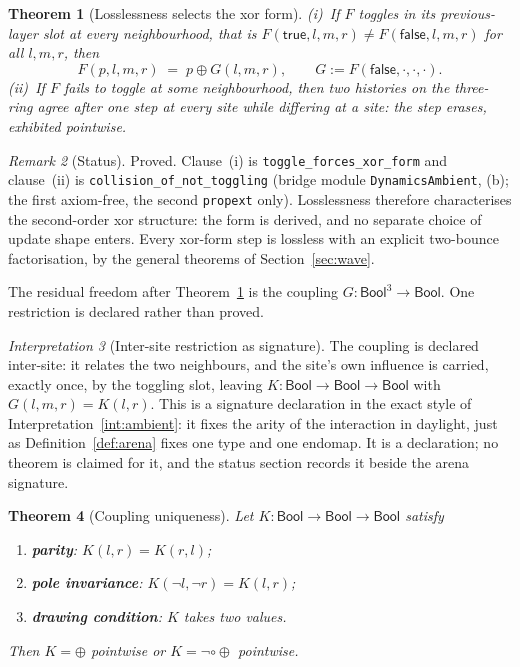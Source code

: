\documentclass[11pt,a4paper]{article}
\theoremstyle{plain}
\newtheorem{theorem}{Theorem}[section]
\theoremstyle{definition}
\theoremstyle{remark}
\newtheorem{remark}[theorem]{Remark}
\newtheorem{interpretation}[theorem]{Interpretation}
\newcommand{\Bool}{\mathsf{Bool}}
\newcommand{\comp}{\circ}
\begin{document}
\begin{theorem}[Losslessness selects the xor form]
\label{thm:toggle}
\textup{(i)}~If $F$ toggles in its previous-layer slot at every
neighbourhood, that is $F(\mathsf{true},l,m,r)\neq
F(\mathsf{false},l,m,r)$ for all $l,m,r$, then
\[
  F(p,l,m,r) \;=\; p \oplus G(l,m,r), \qquad
  G := F(\mathsf{false},\cdot,\cdot,\cdot).
\]
\textup{(ii)}~If $F$ fails to toggle at some neighbourhood, then two
histories on the three-ring agree after one step at every site while
differing at a site: the step erases, exhibited pointwise.
\end{theorem}

\begin{remark}[Status]
Proved. Clause~\textup{(i)} is \texttt{toggle\_forces\_xor\_form}
and clause~\textup{(ii)} is \texttt{collision\_of\_not\_toggling}
(bridge module \texttt{DynamicsAmbient}, (b); the first axiom-free,
the second \texttt{propext} only).
Losslessness therefore characterises the second-order xor structure:
the form is derived, and no separate choice of update shape enters.
Every xor-form step is lossless with an explicit two-bounce
factorisation, by the general theorems of
Section~\ref{sec:wave}.
\end{remark}

The residual freedom after Theorem~\ref{thm:toggle} is the coupling
$G:\Bool^3\to\Bool$. One restriction is declared rather than proved.

\begin{interpretation}[Inter-site restriction as signature]
\label{int:intersite}
The coupling is declared inter-site: it relates the two neighbours, and
the site's own influence is carried, exactly once, by the toggling
slot, leaving $K:\Bool\to\Bool\to\Bool$ with
$G(l,m,r)=K(l,r)$. This is a signature declaration in the exact style
of Interpretation~\ref{int:ambient}: it fixes the arity of the
interaction in daylight, just as Definition~\ref{def:arena} fixes one
type and one endomap. It is a declaration; no theorem is claimed for
it, and the status section records it beside the arena signature.
\end{interpretation}

\begin{theorem}[Coupling uniqueness]
\label{thm:coupling}
Let $K:\Bool\to\Bool\to\Bool$ satisfy
\begin{enumerate}[label=(\roman*)]
\item \textbf{parity}: $K(l,r)=K(r,l)$;
\item \textbf{pole invariance}: $K(\neg l,\neg r)=K(l,r)$;
\item \textbf{drawing condition}: $K$ takes two values.
\end{enumerate}
Then $K=\oplus$ pointwise or $K=\neg\comp\oplus$ pointwise.
\end{theorem}
\end{document}
